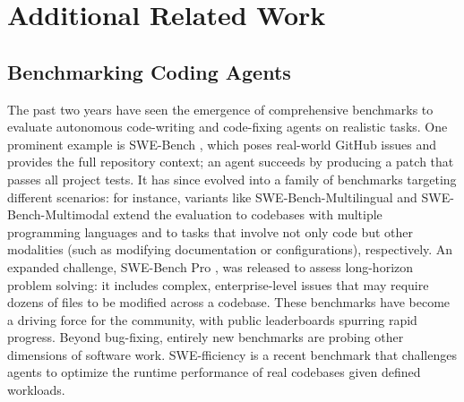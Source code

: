 \section{Additional Related Work}
\label{sec.more_rw}

\subsection{Benchmarking Coding Agents} 
The past two years have seen the emergence of comprehensive benchmarks to evaluate autonomous code-writing and code-fixing agents on realistic tasks. One prominent example is SWE-Bench \citep{swebench}, which poses real-world GitHub issues and provides the full repository context; an agent succeeds by producing a patch that passes all project tests. 
It has since evolved into a family of benchmarks targeting different scenarios: for instance, variants like SWE-Bench-Multilingual \citep{yang2025swesmith} and SWE-Bench-Multimodal \citep{yang2025swebench} extend the evaluation to codebases with multiple programming languages and to tasks that involve not only code but other modalities (such as modifying documentation or configurations), respectively. An expanded challenge, SWE-Bench Pro \citep{sbp}, was released to assess long-horizon problem solving: it includes complex, enterprise-level issues that may require dozens of files to be modified across a codebase. These benchmarks have become a driving force for the community, with public leaderboards spurring rapid progress. Beyond bug-fixing, entirely new benchmarks are probing other dimensions of software work. SWE-fficiency \citep{ma2025swe} is a recent benchmark that challenges agents to optimize the runtime performance of real codebases given defined workloads. 

